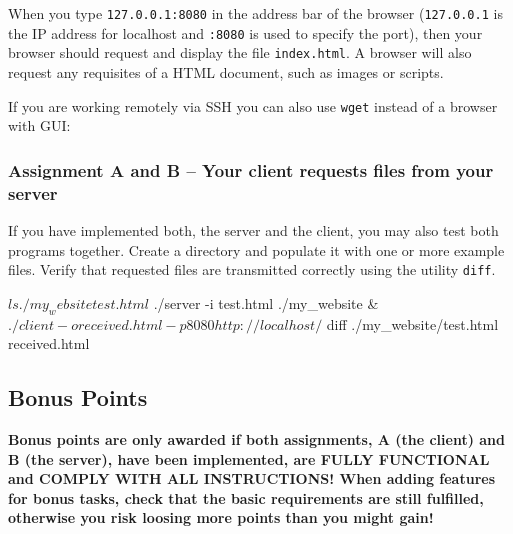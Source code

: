 When you type \verb|127.0.0.1:8080| in the address bar of the browser
(\verb|127.0.0.1| is the IP address for localhost
and \verb|:8080| is used to specify the port),
then your browser should request and display the file \verb|index.html|.
A browser will also request any requisites of a HTML document,
such as images or scripts.

If you are working remotely via SSH
you can also use \verb|wget|
instead of a browser with GUI:


\subsubsection*{Assignment A and B -- Your client requests files from your server}

\vspace{-4mm}
If you have implemented both, the server and the client,
you may also test both programs together.
Create a directory and populate it with one or more example files.
Verify that requested files are transmitted correctly
using the utility \verb|diff|.

\begin{osuefmtcode}
    $ ls ./my_website
    test.html
    $ ./server -i test.html ./my_website &
    $ ./client -o received.html -p 8080 http://localhost/
    $ diff ./my_website/test.html received.html
\end{osuefmtcode}

\vspace{5mm}



\clearpage
\subsection*{Bonus Points}

\vspace{-3mm}
\textbf{Bonus points are only awarded if both assignments,
 A (the client) and B (the server),
have been implemented, are FULLY FUNCTIONAL
and COMPLY WITH ALL INSTRUCTIONS!
When adding features for bonus tasks,
check that the basic requirements are still fulfilled,
otherwise you risk loosing more points than you might gain!
}

